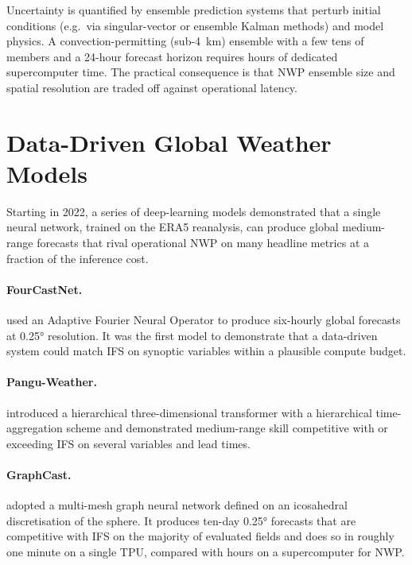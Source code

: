 Uncertainty is quantified by ensemble prediction systems that perturb initial conditions (e.g.\ via singular-vector or ensemble Kalman methods) and model physics. A convection-permitting (sub-\SI{4}{\kilo\metre}) ensemble with a few tens of members and a 24-hour forecast horizon requires hours of dedicated supercomputer time. The practical consequence is that NWP ensemble size and spatial resolution are traded off against operational latency.

\section{Data-Driven Global Weather Models}
\label{sec:bg-dl-global}

Starting in 2022, a series of deep-learning models demonstrated that a single neural network, trained on the ERA5 reanalysis, can produce global medium-range forecasts that rival operational NWP on many headline metrics at a fraction of the inference cost.

\paragraph{FourCastNet.} \citet{pathak2022fourcastnet} used an Adaptive Fourier Neural Operator to produce six-hourly global forecasts at \ang{0.25} resolution. It was the first model to demonstrate that a data-driven system could match IFS on synoptic variables within a plausible compute budget.

\paragraph{Pangu-Weather.} \citet{bi2023pangu} introduced a hierarchical three-dimensional transformer with a hierarchical time-aggregation scheme and demonstrated medium-range skill competitive with or exceeding IFS on several variables and lead times.

\paragraph{GraphCast.} \citet{lam2023graphcast} adopted a multi-mesh graph neural network defined on an icosahedral discretisation of the sphere. It produces ten-day \ang{0.25} forecasts that are competitive with IFS on the majority of evaluated fields and does so in roughly one minute on a single TPU, compared with hours on a supercomputer for NWP.

